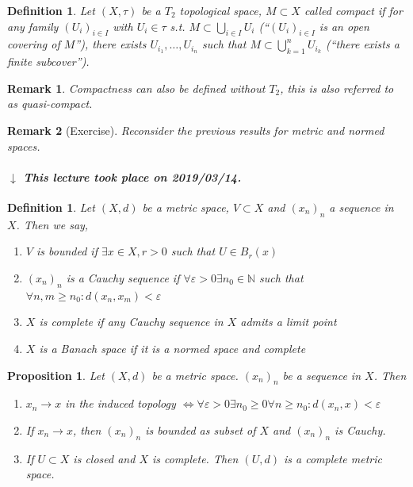\documentclass{article}
\newcounter{lecref}[section]
\numberwithin{lecref}{section}
\newtheorem{definition}[lecref]{Definition}
\newtheorem*{Remark}{Remark}
\newtheorem{proposition}[lecref]{Proposition}
\newcommand{\dateref}[1]{%
  \begin{mdframed}[backgroundcolor=gray!10,innerbottommargin=0pt,innertopmargin=0pt]
    \paragraph{\textit{$\downarrow$ This lecture took place on #1.}}%
  \end{mdframed}%
}
\begin{document}
\begin{definition}
	\label{definition:1.12}
	Let $(X, \tau)$ be a $T_2$ topological space, $M \subset X$ called \emph{compact} if for any family $(U_i)_{i \in I}$ with $U_i \in \tau$ s.t. $M \subset \bigcup_{i \in I} U_i$ (\enquote{$(U_i)_{i \in I}$ is an open covering of $M$}), there exists $U_{i_1}, \dots, U_{i_n}$ such that $M \subset \bigcup_{k=1}^n U_{i_k}$ (\enquote{there exists a finite subcover}).
\end{definition}

\begin{Remark}
	Compactness can also be defined without $T_2$, this is also referred to as \emph{quasi-compact}.
\end{Remark}

\begin{Remark}[Exercise]
	Reconsider the previous results for metric and normed spaces.
\end{Remark}

\dateref{2019/03/14}

\begin{definition}
	\label{definition:1.13}
	Let $(X, d)$ be a metric space, $V \subset X$ and $(x_n)_n$ a sequence in $X$. Then we say,
	\begin{enumerate}
		\item $V$ is \emph{bounded} if $\exists x \in X, r > 0$ such that $U \in B_r(x)$
		\item $(x_n)_n$ is a \emph{Cauchy sequence} if $\forall \varepsilon > 0 \exists n_0 \in \mathbb N$ such that $\forall n, m \geq n_0: d(x_n, x_m) < \varepsilon$
		\item $X$ is \emph{complete} if any Cauchy sequence in $X$ admits a limit point
		\item $X$ is a \emph{Banach space} if it is a normed space and complete
	\end{enumerate}
\end{definition}

\begin{proposition}
	\label{proposition:1.14}
	Let $(X, d)$ be a metric space. $(x_n)_n$ be a sequence in $X$. Then
	\begin{enumerate}
		\item $x_n \to x$ in the induced topology $\iff \forall \varepsilon > 0 \exists n_0 \geq 0 \forall n \geq n_0: d(x_n, x) < \varepsilon$
		\item If $x_n \to x$, then $(x_n)_n$ is bounded as subset of $X$ and $(x_n)_n$ is Cauchy.
		\item If $U \subset X$ is closed and $X$ is complete. Then $(U, d)$ is a complete metric space.
	\end{enumerate}
\end{proposition}
\end{document}
